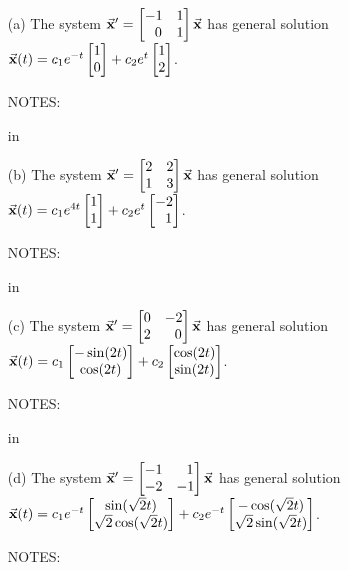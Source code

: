 \documentclass[epsf]{article}
\begin{document}
\begin{itemize}
\item[(a)] The system $\vec{\bf x}' = \begin{bmatrix}-1 & 1\cr\ \ 0 & 1 \end{bmatrix}\vec{\bf x}$ has general solution
$\vec{\bf x}(t) = c_1e^{-t}\begin{bmatrix}1 \cr0 \end{bmatrix} + c_2e^{t}\begin{bmatrix} 1 \cr 2 \end{bmatrix}$.

\noi NOTES:

 in

\item[(b)]  The system $\vec{\bf x}' = \begin{bmatrix}2 & 2\cr 1 & 3 \end{bmatrix}\vec{\bf x}$ has general solution
$\vec{\bf x}(t) = c_1e^{4t}\begin{bmatrix}1 \cr1 \end{bmatrix} + c_2e^{t}\begin{bmatrix} -2 \cr \ \ 1 \end{bmatrix}$.

\noi NOTES:

 in

\item[(c)] The system $\vec{\bf x}' = \begin{bmatrix}0 & -2\cr 2 & \ \ 0 \end{bmatrix}\vec{\bf x}$ has general solution
$\vec{\bf x}(t) = c_1\begin{bmatrix}-\sin(2t) \cr \cos(2t) \end{bmatrix} + c_2\begin{bmatrix}\cos(2t)\cr \sin(2t) \end{bmatrix}$.

\noi NOTES:

 in


\item[(d)] The system $\vec{\bf x}' = \begin{bmatrix}-1 & \ \ 1\cr -2 & -1 \end{bmatrix}\vec{\bf x}$ has general solution
$\vec{\bf x}(t) = c_1e^{-t}\begin{bmatrix}\sin(\sqrt{2}t) \cr\sqrt{2} \cos(\sqrt{2}t) \end{bmatrix} + c_2e^{-t}\begin{bmatrix}-\cos(\sqrt{2}t)\cr \sqrt{2}\sin(\sqrt{2}t) \end{bmatrix}$.

\noi NOTES:


\end{itemize}
\end{document}
